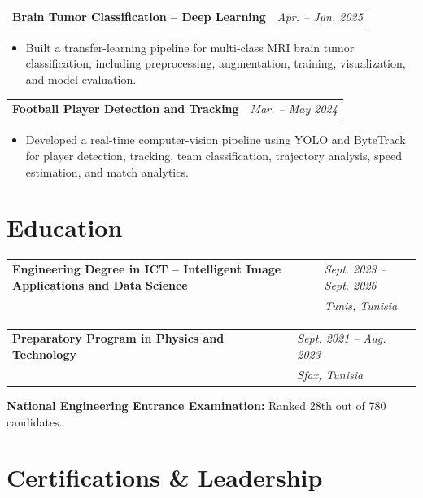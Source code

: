 \documentclass[10pt,letterpaper]{article}
\makeatletter
\newcommand{\resumeEntry}[4]{%
    \begin{tabularx}{\textwidth}
    {@{}>{\RaggedRight\arraybackslash}X
    >{\RaggedLeft\arraybackslash}p{1.65in}@{}}

        \textbf{#1}
        &
        {\small\textit{#2}}
        \\[-1pt]

        {\small\textit{\color{secondary}#3}}
        &
        {\small\textit{\color{secondary}#4}}

    \end{tabularx}
}
\newcommand{\projectEntry}[2]{%
    \begin{tabularx}{\textwidth}
    {@{}>{\RaggedRight\arraybackslash}X
    >{\RaggedLeft\arraybackslash}p{1.65in}@{}}

        \textbf{#1}
        &
        {\small\textit{#2}}

    \end{tabularx}
}
\makeatother
\begin{document}
\vspace{1pt}

\projectEntry
{Brain Tumor Classification -- Deep Learning}
{Apr. -- Jun. 2025}
\vspace{-11pt}

\begin{itemize}
    \item Built a transfer-learning pipeline for multi-class MRI brain tumor
    classification, including preprocessing, augmentation, training,
    visualization, and model evaluation.
\end{itemize}

\vspace{1pt}

\projectEntry
{Football Player Detection and Tracking}
{Mar. -- May 2024}
\vspace{-9pt}

\begin{itemize}
    \item Developed a real-time computer-vision pipeline using YOLO and ByteTrack
    for player detection, tracking, team classification, trajectory analysis,
    speed estimation, and match analytics.
\end{itemize}


\section{Education}

\resumeEntry
{Engineering Degree in ICT -- Intelligent Image Applications and Data Science}
{Sept. 2023 -- Sept. 2026}
{Higher School of Communications of Tunis (SUP'COM)}
{Tunis, Tunisia}


\resumeEntry
{Preparatory Program in Physics and Technology}
{Sept. 2021 -- Aug. 2023}
{Preparatory Institute for Engineering Studies}
{Sfax, Tunisia}
\vspace{-4pt}


{\small
\textbf{National Engineering Entrance Examination:}
Ranked 28th out of 780 candidates.
}
\vspace{-4pt}


\section{Certifications \& Leadership}
\end{document}
